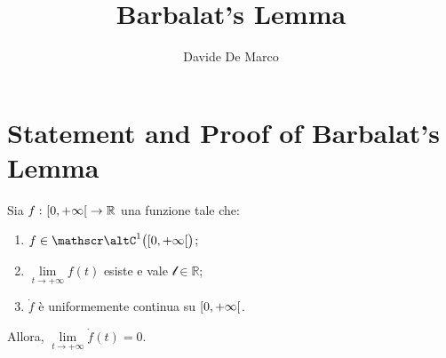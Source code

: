 \documentclass[a4paper,12pt]{article}
\title{%
  \textbf{Barbalat's Lemma}\\
}
\author{%
  Davide De Marco
}
\date{}
\begin{document}
\maketitle
\section{Statement and Proof of Barbalat's Lemma}
\begin{namelemma}[Barbalat's]\label{lemma:barbalat}
  Sia $f \, \colon \interval[open right]{0}{+\infty} \to \mathbb{R}$ una funzione tale che:
  \begin{enumerate}[label=\upshape({\itshape\roman*}\kern 0.6pt), ref=({\itshape\roman*}\kern 0.6pt)]
    \item $f \in \classC{1}\bigl(\interval[open right]{0}{+\infty}\bigr)$;
    \item $\lim\limits_{t \to + \infty} f(t)$ esiste e vale $\mathscr{l} \in \mathbb{R}$;
    \item $\dot{f}$ è uniformemente continua su $\interval[open right]{0}{+\infty}$.
  \end{enumerate}
  Allora, $\lim\limits_{t \to + \infty} \dot{f}(t) = 0$.
\end{namelemma}
\end{document}
